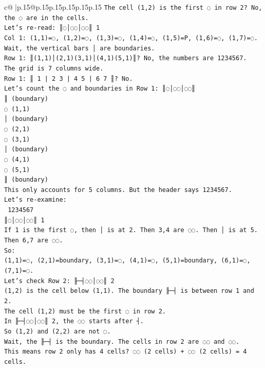 \documentclass{article}
\begin{document}
{\begin{supertabular}{c@{$\;$}|p{.15\linewidth}@{}p{.15\linewidth}p{.15\linewidth}p{.15\linewidth}p{.15\linewidth}p{.15\linewidth}}
{{{\texttt{The cell (1,2) is the first ◌ in row 2? No, the ◌ are in the cells.} \\
\texttt{Let's re{-}read: ║◌│◌◌│◌◌║ 1} \\
\texttt{Col 1: (1,1)=◌, (1,2)=◌, (1,3)=◌, (1,4)=◌, (1,5)=P, (1,6)=◌, (1,7)=◌.} \\
\texttt{Wait, the vertical bars │ are boundaries.} \\
\texttt{Row 1: ║(1,1)│(2,1)(3,1)│(4,1)(5,1)║? No, the numbers are 1234567.} \\
\texttt{The grid is 7 columns wide.} \\
\texttt{Row 1: ║ 1 | 2 3 | 4 5 | 6 7 ║? No.} \\
\texttt{Let's count the ◌ and boundaries in Row 1: ║◌│◌◌│◌◌║} \\
\texttt{║ (boundary)} \\
\texttt{◌ (1,1)} \\
\texttt{│ (boundary)} \\
\texttt{◌ (2,1)} \\
\texttt{◌ (3,1)} \\
\texttt{│ (boundary)} \\
\texttt{◌ (4,1)} \\
\texttt{◌ (5,1)} \\
\texttt{║ (boundary)} \\
\texttt{This only accounts for 5 columns. But the header says 1234567.} \\
\texttt{Let's re{-}examine:} \\
\texttt{ 1234567} \\
\texttt{║◌│◌◌│◌◌║ 1} \\
\texttt{If 1 is the first ◌, then │ is at 2. Then 3,4 are ◌◌. Then │ is at 5. Then 6,7 are ◌◌.} \\
\texttt{So:} \\
\texttt{(1,1)=◌, (2,1)=boundary, (3,1)=◌, (4,1)=◌, (5,1)=boundary, (6,1)=◌, (7,1)=◌.} \\
\texttt{Let's check Row 2: ╟─┤◌◌│◌◌║ 2} \\
\texttt{(1,2) is the cell below (1,1). The boundary ╟─┤ is between row 1 and 2.} \\
\texttt{The cell (1,2) must be the first ◌ in row 2.} \\
\texttt{In ╟─┤◌◌│◌◌║ 2, the ◌◌ starts after ┤.} \\
\texttt{So (1,2) and (2,2) are not ◌.} \\
\texttt{Wait, the ╟─┤ is the boundary. The cells in row 2 are ◌◌ and ◌◌.} \\
\texttt{This means row 2 only has 4 cells? ◌◌ (2 cells) + ◌◌ (2 cells) = 4 cells.} \\
}}}
\end{supertabular}}
\end{document}
